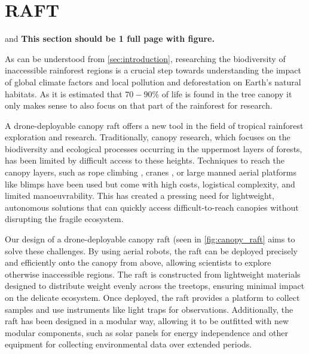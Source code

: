     \section{RAFT}
     and 
\textbf{This section should be 1 full page with figure.}

As can be understood from \autoref{sec:introduction}, researching the biodiversity of inaccessible rainforest regions is a crucial step towards understanding the impact of global climate factors and local pollution and deforestation on Earth's natural habitats. As it is estimated that $70-90$\% of life is found in the tree canopy \cite{butler2019} it only makes sense to also focus on that part of the rainforest for research. 

A drone-deployable canopy raft offers a new tool in the field of tropical rainforest exploration and research. Traditionally, canopy research, which focuses on the biodiversity and ecological processes occurring in the uppermost layers of forests, has been limited by difficult access to these heights. Techniques to reach the canopy layers, such as rope climbing \cite{dial1994description}\cite{picart2014cafotrop}, cranes \cite{Wright2010}, or large manned aerial platforms like blimps \cite{Aberlenc2007} have been used but come with high costs, logistical complexity, and limited manoeuvrability. This has created a pressing need for lightweight, autonomous solutions that can quickly access difficult-to-reach canopies without disrupting the fragile ecosystem.

Our design of a drone-deployable canopy raft (seen in \autoref{fig:canopy_raft} aims to solve these challenges. By using aerial robots, the raft can be deployed precisely and efficiently onto the canopy from above, allowing scientists to explore otherwise inaccessible regions. The raft is constructed from lightweight materials designed to distribute weight evenly across the treetops, ensuring minimal impact on the delicate ecosystem. Once deployed, the raft provides a platform to collect samples and use instruments like light traps for observations. Additionally, the raft has been designed in a modular way, allowing it to be outfitted with new modular components, such as solar panels for energy independence and other equipment for collecting environmental data over extended periods.

